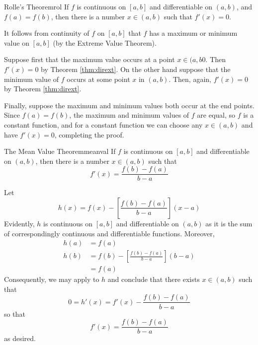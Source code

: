 \documentclass[12pt]{report}
\begin{document}
\begin{namthm}{Rolle's Theorem}{rol}
    If $f$ is continuous on $[a,b]$ and differentiable on $(a,b)$, and $f(a) = f(b)$, then there is a number $x \in (a,b)$ such that $f'(x) = 0$.
\end{namthm}
\begin{proof*}{}{}
    It follows from continuity of $f$ on $[a,b]$ that $f$ has a maximum or minimum value on $[a,b]$ (by the Extreme Value Theorem).

    Suppose first that the maximum value occurs at a point $x \in (a,b0$. Then $f'(x) = 0$ by Theorem \ref{thm:dirext}. On the other hand suppose that the minimum value of $f$ occurs at some point $x$ in $(a,b)$. Then, again, $f'(x) = 0$ by Theorem \ref{thm:dirext}.

    Finally, suppose the maximum and minimum values both occur at the end points. Since $f(a) = f(b)$, the maximum and minimum values of $f$ are equal, so $f$ is a constant function, and for a constant function we can choose any $x \in (a,b)$ and have $f'(x) = 0$, completing the proof.
\end{proof*}


\begin{namthm}{The Mean Value Theorem}{meanval}
    If $f$ is continuous on $[a,b]$ and differentiable on $(a,b)$, then there is a number $x \in (a,b)$ such that \begin{equation}
        f'(x) = \frac{f(b)-f(a)}{b-a} 
    \end{equation}
\end{namthm}
\begin{proof*}{}{}
    Let \begin{equation*}
        h(x) = f(x) - \left[\frac{f(b) - f(a)}{b-a}\right](x-a)
    \end{equation*}
    Evidently, $h$ is continuous on $[a,b]$ and differentiable on $(a,b)$ as it is the sum of correspondingly continuous and differentiable functions. Moreover, \begin{align*}
        h(a) &= f(a) \\
        h(b) &= f(b) - \left[\frac{f(b) - f(a)}{b-a}\right](b-a) \\
        &= f(a)
    \end{align*}
    Consequently, we may apply  to $h$ and conclude that there exists $x \in (a,b)$ such that \begin{equation*} 
        0 = h'(x) = f'(x) - \frac{f(b)-f(a)}{b-a}
    \end{equation*}
    so that \begin{equation*}
        f'(x) = \frac{f(b) - f(a)}{b-a}
    \end{equation*}
    as desired.
\end{proof*}
\end{document}
